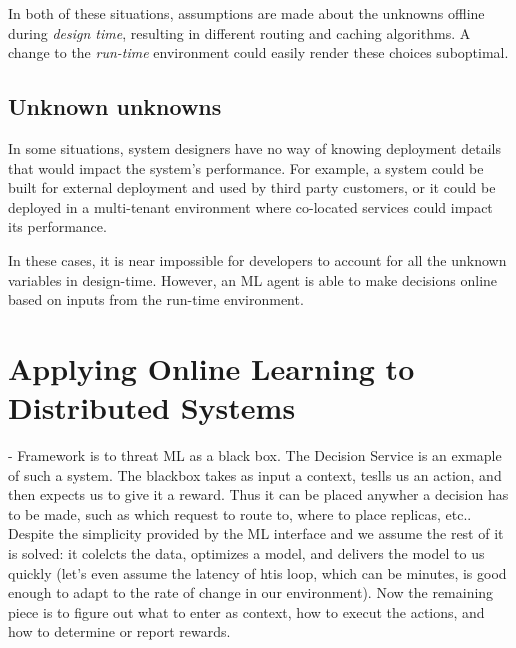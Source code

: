 \documentclass[a4paper,twocolumn]{article}
\newcommand{\ignore}[1]{}
\begin{document}
In both of these situations, assumptions are made about the unknowns offline during
\emph{design time}, resulting in different routing and caching algorithms. A change to
the \emph{run-time} environment could easily render these choices suboptimal.

\ignore{Online learning has the potential to make these decisions online, based on current contexts,
and can be nimble in adapting to any changes to the run-time
environment.}

\subsection*{Unknown unknowns}
In some situations, system designers have no way of knowing deployment details
that would impact the system's performance. For example, a system could be built
for external deployment and used by third party customers, or it could be
deployed in a multi-tenant environment where co-located services could impact
its performance.

In these cases, it is near impossible for developers to account for all the
unknown variables in design-time. However, an ML agent is able to make decisions
online based on inputs from the run-time environment.

\ignore{
To be clear, ML has been used in some distributed systems. However, it has not
been used in a general way to make online decisions about core distributed
systems implementation details. We advocate that developers should focus on
high-level objectives of their system, and use online ML to make to compute the
specifics (such as policies for request routing, replica placement, or failure
monitoring) at run-time based on observed metrics.
}

\section{Applying Online Learning to Distributed Systems}

- Framework is to threat ML as a black box. The Decision Service is an exmaple of such a system.
The blackbox takes as input a context, teslls us an action, and then expects us to give it
a reward. Thus it can be placed anywher a decision has to be made, such as which request
to route to, where to place replicas, etc.. Despite the simplicity provided by the ML interface
and we assume the rest of it is solved: it colelcts the data, optimizes a model, and delivers the model
to us quickly (let's even assume the latency of htis loop, which can be minutes, is good enough to adapt
to the rate of change in our environment). Now the remaining piece is to figure out what
to enter as context, how to execut the actions, and how to determine or report rewards.
\end{document}
